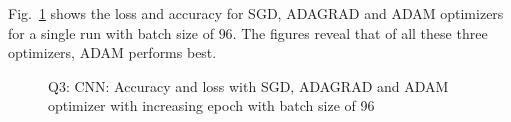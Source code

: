 Fig.~\ref{fig:q3_loss_acc_96} shows the loss and accuracy for SGD, ADAGRAD and ADAM optimizers for a single run with batch size of $96$. The figures reveal that of all these three optimizers, ADAM performs best.
\begin{figure}[!h]
	\centering
	\hspace{0.5cm}
	\hspace{0.5cm}
	\caption{Q3: CNN: Accuracy and loss with SGD, ADAGRAD and ADAM optimizer with increasing epoch with batch size of 96}
	\label{fig:q3_loss_acc_96}
\end{figure}
